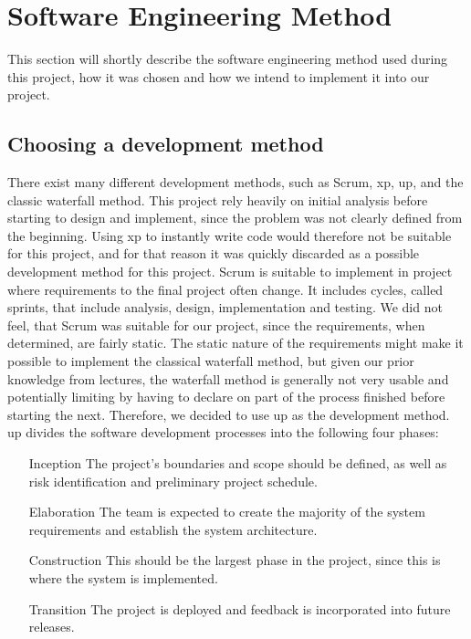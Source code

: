 \section{Software Engineering Method}
This section will shortly describe the software engineering method used during this project, how it was chosen and how we intend to implement it into our project.

\subsection{Choosing a development method}
There exist many different development methods, such as Scrum, \ac{xp}, \ac{up}, and the classic waterfall method. This project rely heavily on initial analysis before starting to design and implement, since the problem was not clearly defined from the beginning. Using \ac{xp} to instantly write code would therefore not be suitable for this project, and for that reason it was quickly discarded as a possible development method for this project. Scrum is suitable to implement in project where requirements to the final project often change. It includes cycles, called sprints, that include analysis, design, implementation and testing. We did not feel, that Scrum was suitable for our project, since the requirements, when determined, are fairly static. The static nature of the requirements might make it possible to implement the classical waterfall method, but given our prior knowledge from lectures, the waterfall method is generally not very usable and potentially limiting by having to declare on part of the process finished before starting the next. Therefore, we decided to use \ac{up} as the development method. \ac{up} divides the software development processes into the following four phases: 

\begin{itemize}
\item[Inception] The project's boundaries and scope should be defined, as well as risk identification and preliminary project schedule.
\item[Elaboration] The team is expected to create the majority of the system requirements and establish the system architecture.
\item[Construction] This should be the largest phase in the project, since this is where the system is implemented.
\item[Transition] The project is deployed and feedback is incorporated into future releases.
\end{itemize}

